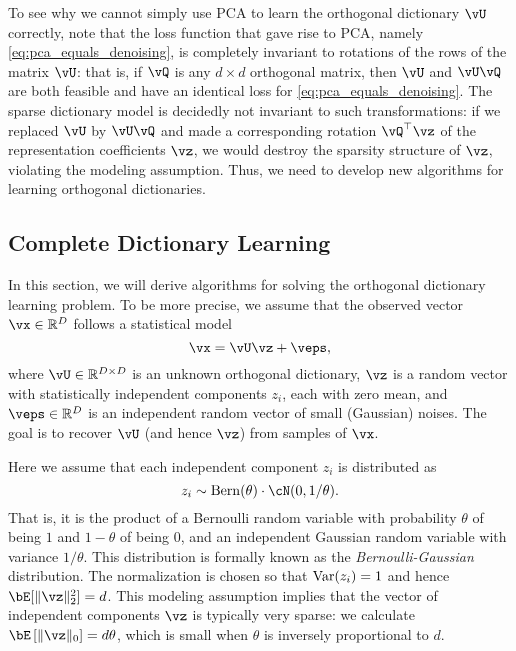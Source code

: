 \documentclass[../../book-main.tex]{subfiles}
\begin{document}
To see why we cannot simply use PCA to learn the orthogonal dictionary $\vU$ correctly, note that the 
loss function that gave rise to PCA, namely \eqref{eq:pca_equals_denoising}, is completely invariant to rotations of the rows of the matrix $\vU$: that is, if $\vQ$ is any $d \times d$ orthogonal matrix, then $\vU$ and $\vU \vQ$ are both feasible and have an identical loss for \eqref{eq:pca_equals_denoising}. The sparse dictionary model is decidedly not invariant to such transformations: if we replaced $\vU$ by $\vU \vQ$ and made a corresponding rotation $\vQ^\top \vz$ of the representation coefficients $\vz$, we would destroy the sparsity structure of $\vz$, violating the modeling assumption. Thus, we need to develop new algorithms for learning orthogonal dictionaries. 

\subsection{Complete Dictionary Learning}
\label{sec:complete-dictionary}

In this section, we will derive algorithms for solving the orthogonal dictionary learning problem. To be more precise,  we assume that the observed vector $\vx \in \R^D$ follows a statistical model
\begin{equation}
    \vx = \vU \vz + \veps, 
    \label{eq:ica-model-ch2}
\end{equation}
where $\vU \in \R^{D \times D}$ is an unknown orthogonal dictionary, $\vz$ is a random vector with statistically independent components $z_i$, each with zero mean, and $\veps \in \R^D$ is an independent random vector of small (Gaussian) noises. The goal is to recover $\vU$ (and hence $\vz$) from samples of $\vx$.

Here we assume that each independent component $z_i$ is distributed as $$z_i \sim \mathrm{Bern}(\theta) \cdot \cN(0, 1/\theta).$$ That is, it is the product of a Bernoulli random variable with probability $\theta$ of being $1$ and $1-\theta$ of being $0$, and an independent Gaussian random variable with variance $1/\theta$. This distribution is formally known as the {\em Bernoulli-Gaussian} distribution. 
The normalization is chosen so that $\operatorname{Var}(z_i) = 1$ and hence $\bE[\norm{\vz}_2^2]=d$. 
This modeling assumption implies that the vector of independent components $\vz$ is typically very sparse: 
we calculate $\bE\left[\norm{\vz}_0\right] = d\theta$, which is small when $\theta$ is inversely proportional to $d$. 
\end{document}

